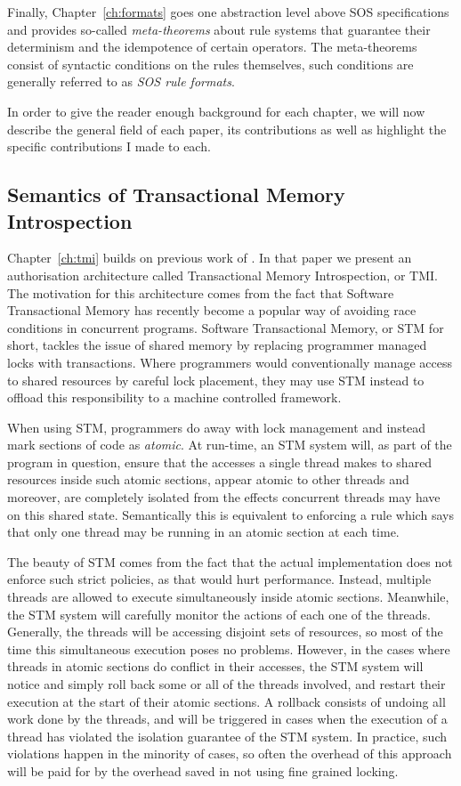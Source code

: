Finally, Chapter~\ref{ch:formats} goes one abstraction level above SOS specifications
and provides so-called \emph{meta-theorems} about rule systems that guarantee their
determinism and the idempotence of certain operators. The meta-theorems consist of
syntactic conditions on the rules themselves, such conditions are generally referred
to as \emph{SOS rule formats}.

In order to give the reader enough background for each chapter, we will now describe
the general field of each paper, its contributions as well as highlight the specific
contributions I made to each.

\subsection{Semantics of Transactional Memory Introspection} %

Chapter~\ref{ch:tmi} builds on previous work of \cite{tmi}. In that paper we present
an authorisation architecture called Transactional Memory Introspection, or TMI.
The motivation for this architecture comes from the fact that Software Transactional
Memory has recently become a popular way of avoiding race conditions in concurrent
programs. Software Transactional Memory, or STM for short, tackles the issue of
shared memory by replacing programmer managed locks with transactions. Where programmers
would conventionally manage access to shared resources by careful lock placement,
they may use STM instead to offload this responsibility to a machine controlled
framework.

When using STM, programmers do away with lock management and instead mark sections
of code as \emph{atomic}. At run-time, an STM system will, as part of the program
in question, ensure that the accesses a single thread makes to shared resources
inside such atomic sections, appear atomic to other threads and moreover, are
completely isolated from the effects concurrent threads may have on this shared
state. Semantically this is equivalent to enforcing a rule which says that only
one thread may be running in an atomic section at each time.

The beauty of STM comes from the fact that the actual implementation 
does not enforce such strict policies, 
as that would hurt performance. Instead, multiple threads are allowed to
execute simultaneously inside atomic sections. Meanwhile, the STM system will carefully
monitor the actions of each one of the threads. Generally, the threads will be
accessing disjoint sets of resources, so most of the time this simultaneous execution
poses no problems. However, in the cases where threads in atomic sections do conflict
in their accesses, the STM system will notice and simply roll back some or all
of the threads involved, and restart their execution at the start of their atomic
sections. A rollback consists of undoing all work done by the threads, and will
be triggered in cases when the execution of a thread has violated the isolation
guarantee of the STM system. In practice, such violations happen in the minority
of cases, so often the overhead of this approach will be paid for by the overhead
saved in not using fine grained locking.

